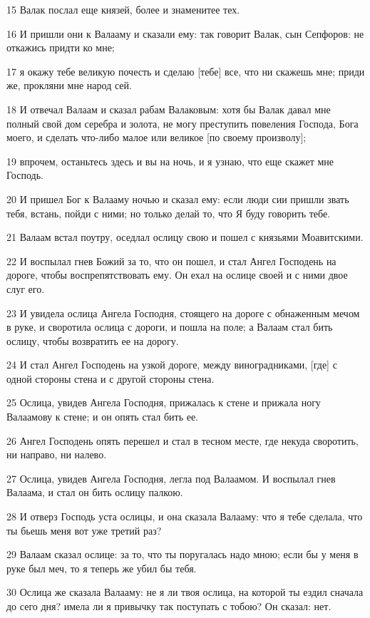 \par 15 Валак послал еще князей, более и знаменитее тех.
\par 16 И пришли они к Валааму и сказали ему: так говорит Валак, сын Сепфоров: не откажись придти ко мне;
\par 17 я окажу тебе великую почесть и сделаю [тебе] все, что ни скажешь мне; приди же, прокляни мне народ сей.
\par 18 И отвечал Валаам и сказал рабам Валаковым: хотя бы Валак давал мне полный свой дом серебра и золота, не могу преступить повеления Господа, Бога моего, и сделать что-либо малое или великое [по своему произволу];
\par 19 впрочем, останьтесь здесь и вы на ночь, и я узнаю, что еще скажет мне Господь.
\par 20 И пришел Бог к Валааму ночью и сказал ему: если люди сии пришли звать тебя, встань, пойди с ними; но только делай то, что Я буду говорить тебе.
\par 21 Валаам встал поутру, оседлал ослицу свою и пошел с князьями Моавитскими.
\par 22 И воспылал гнев Божий за то, что он пошел, и стал Ангел Господень на дороге, чтобы воспрепятствовать ему. Он ехал на ослице своей и с ними двое слуг его.
\par 23 И увидела ослица Ангела Господня, стоящего на дороге с обнаженным мечом в руке, и своротила ослица с дороги, и пошла на поле; а Валаам стал бить ослицу, чтобы возвратить ее на дорогу.
\par 24 И стал Ангел Господень на узкой дороге, между виноградниками, [где] с одной стороны стена и с другой стороны стена.
\par 25 Ослица, увидев Ангела Господня, прижалась к стене и прижала ногу Валаамову к стене; и он опять стал бить ее.
\par 26 Ангел Господень опять перешел и стал в тесном месте, где некуда своротить, ни направо, ни налево.
\par 27 Ослица, увидев Ангела Господня, легла под Валаамом. И воспылал гнев Валаама, и стал он бить ослицу палкою.
\par 28 И отверз Господь уста ослицы, и она сказала Валааму: что я тебе сделала, что ты бьешь меня вот уже третий раз?
\par 29 Валаам сказал ослице: за то, что ты поругалась надо мною; если бы у меня в руке был меч, то я теперь же убил бы тебя.
\par 30 Ослица же сказала Валааму: не я ли твоя ослица, на которой ты ездил сначала до сего дня? имела ли я привычку так поступать с тобою? Он сказал: нет.
